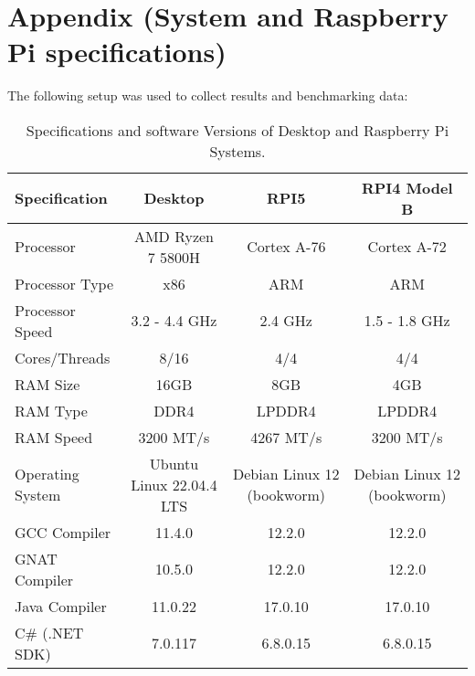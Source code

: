 \section{Appendix (System and Raspberry Pi specifications)}
\label{sec:sysetm_specs}

The following setup was used to collect results and benchmarking data:

\begin{table}[htbp]
	\centering
	\begin{tabular}{@{}lccc@{}}
		\toprule
		\textbf{Specification} & \textbf{Desktop} & \textbf{RPI5} & \textbf{RPI4 Model B} \\ 
		\midrule
		Processor             & AMD Ryzen 7 5800H & Cortex A-76 & Cortex A-72 \\
		\hline %
		Processor Type          & x86                      & ARM            & ARM \\
		\hline %
		Processor Speed        & 3.2 - 4.4 GHz       & 2.4 GHz       & 1.5 - 1.8 GHz\\
		\hline %
		Cores/Threads            & 8/16                    & 4/4                & 4/4 \\
		\hline %
		RAM Size                   & 16GB                  & 8GB              & 4GB \\
		\hline %
		RAM Type                  & DDR4                  & LPDDR4       & LPDDR4 \\
		\hline %
		RAM Speed                & 3200 MT/s           & 4267 MT/s    &3200 MT/s \\
		\hline %
		Operating System      & Ubuntu Linux 22.04.4 LTS & Debian Linux 12 (bookworm) &  Debian Linux 12 (bookworm)\\
		\hline %
		GCC Compiler           & 11.4.0               & 12.2.0        &  12.2.0\\
		\hline %
		GNAT Compiler         & 10.5.0               & 12.2.0        &  12.2.0\\
		\hline %
		Java Compiler            & 11.0.22            & 17.0.10      &  17.0.10\\
		\hline %
		C\# (.NET SDK)         & 7.0.117             & 6.8.0.15     &  6.8.0.15\\
		\bottomrule
	\end{tabular}
	\caption{Specifications and software Versions of Desktop and Raspberry Pi Systems\cite{rasp_pi5_pi4_comparision}\cite{desktop_specs}\cite{rpi_specs}.}
	\label{tab:spec_comparisons}
\end{table}



